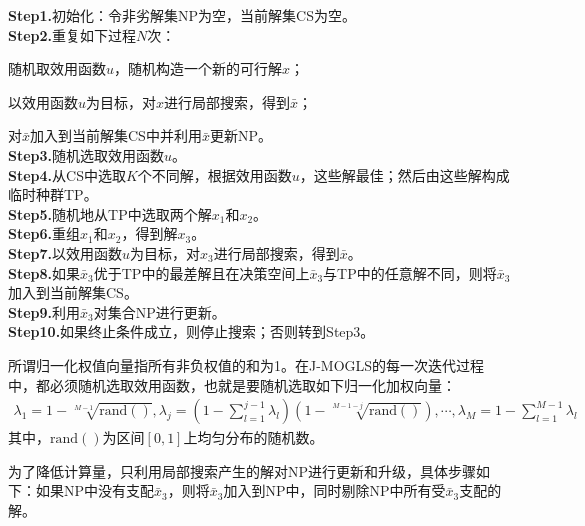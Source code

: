             \textbf{Step1.}初始化：令非劣解集NP为空，当前解集CS为空。\\
            \textbf{Step2.}重复如下过程$N$次：
            \par
            随机取效用函数$u$，随机构造一个新的可行解$x$；
            \par
            以效用函数$u$为目标，对$x$进行局部搜索，得到$\bar{x}$；
            \par
            对$\bar{x}$加入到当前解集CS中并利用$\bar{x}$更新NP。\\
            \textbf{Step3.}随机选取效用函数$u$。\\
            \textbf{Step4.}从CS中选取$K$个不同解，根据效用函数$u$，这些解最佳；然后由这些解构成临时种群TP。\\
            \textbf{Step5.}随机地从TP中选取两个解$x_1$和$x_2$。\\
            \textbf{Step6.}重组$x_1$和$x_2$，得到解$x_3$。\\
            \textbf{Step7.}以效用函数$u$为目标，对$x_3$进行局部搜索，得到$\bar{x}$。\\
            \textbf{Step8.}如果${\bar{x}}_3$优于TP中的最差解且在决策空间上${\bar{x}}_3$与TP中的任意解不同，则将${\bar{x}}_3$加入到当前解集CS。\\
            \textbf{Step9.}利用${\bar{x}}_3$对集合NP进行更新。\\
            \textbf{Step10.}如果终止条件成立，则停止搜索；否则转到Step3。
            \par
            所谓归一化权值向量指所有非负权值的和为1。在J-MOGLS的每一次迭代过程中，都必须随机选取效用函数，也就是要随机选取如下归一化加权向量：
            \begin{align*}
              {\lambda}_1=1-\sqrt[M-1]{\mathrm{rand}()},{\lambda}_j=\left(1-\mathop{\sum}\limits_{l=1}^{j-1}{\lambda}_l\right)(1-\sqrt[M-1-j]{\mathrm{rand}()}),\cdots,{\lambda}_M=1-\mathop{\sum}\limits_{l=1}^{M-1}{\lambda}_l
            \end{align*}
            其中，$\mathrm{rand}()$为区间$[0,1]$上均匀分布的随机数。
            \par
            为了降低计算量，只利用局部搜索产生的解对NP进行更新和升级，具体步骤如下：如果NP中没有支配${\bar{x}}_3$，则将${\bar{x}}_3$加入到NP中，同时剔除NP中所有受${\bar{x}}_3$支配的解。
